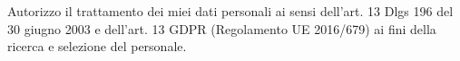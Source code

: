 \documentclass[a4paper,italian]{twentysecondcv_ita} %
\begin{document}
\vspace*{\fill}
Autorizzo il trattamento dei miei dati personali ai sensi dell'art. 13 Dlgs 196 del 30 giugno 2003 e dell'art. 13 GDPR (Regolamento UE 2016/679) ai fini della ricerca e selezione del personale.










\end{document}
